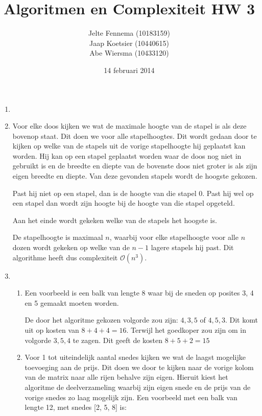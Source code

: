 \documentclass[11pt]{article}
\title{\textbf{Algoritmen en Complexiteit HW 3}}
\author{Jelte Fennema (10183159)\\
		Jaap Koetsier (10440615)\\
        Abe Wiersma (10433120)}
\date{14 februari 2014}
\newcommand{\bigO}{\ensuremath{\mathcal{O}}}
\begin{document}
\maketitle

\begin{enumerate}
    \item

    \item
        Voor elke doos kijken we wat de maximale hoogte van de stapel is als
        deze bovenop staat. Dit doen we voor alle stapelhoogtes. Dit wordt
        gedaan door te kijken op welke van de stapels uit de vorige stapelhoogte
        hij geplaatst kan worden. Hij kan op een stapel geplaatst worden waar de
        doos nog niet in gebruikt is en de breedte en diepte van de bovenste
        doos niet groter is als zijn eigen breedte en diepte. Van deze gevonden
        stapels wordt de hoogste gekozen.

        Past hij niet op een stapel, dan is de hoogte van die stapel 0. Past hij
        wel op een stapel dan wordt zijn hoogte bij de hoogte van die stapel
        opgeteld.

        Aan het einde wordt gekeken welke van de stapels het hoogste is.

        De stapelhoogte is maximaal $n$, waarbij voor elke stapelhoogte voor
        alle $n$ dozen wordt gekeken op welke van de $n - 1$ lagere stapels hij
        past. Dit algorithme heeft dus complexiteit \bigO$(n^3)$.

    \item
        \begin{enumerate}
            \item
                Een voorbeeld is een balk van lengte 8 waar bij de sneden op
                posites 3, 4 en 5 gemaakt moeten worden.

                De door het algoritme gekozen volgorde zou zijn: $4, 3, 5$ of
                $4, 5, 3$. Dit komt uit op kosten van $8+4+4=16$. Terwijl het
                goedkoper zou zijn om in volgorde $3, 5, 4$ te zagen. Dit geeft
                de kosten $8+5+2=15$

            \item
                Voor 1 tot uiteindelijk aantal snedes kijken we wat de
                laagst mogelijke toevoeging aan de prijs. Dit doen we door te
                kijken naar de vorige kolom van de matrix naar alle rijen
                behalve zijn eigen.
                \pagebreak 
                Hieruit kiest het algoritme de
                deelverzameling waarbij zijn eigen snede en de prijs van de vorige snedes zo laag mogelijk zijn. Een voorbeeld met een
                balk van lengte 12, met snedes [2, 5, 8] is:


\end{enumerate}
\end{enumerate}
\end{document}
